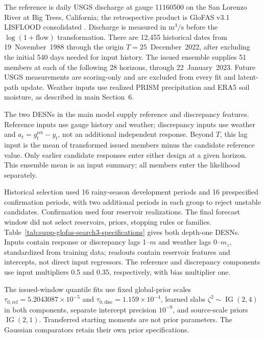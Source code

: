 \documentclass[12pt,letterpaper]{article}
\newcommand{\IG}{\operatorname{IG}}
\newcommand{\TableStyle}{\footnotesize\setlength{\tabcolsep}{4pt}\renewcommand{\arraystretch}{1.08}}
\numberwithin{suppalgorithm}{section}
\numberwithin{equation}{section}
\numberwithin{table}{section}
\numberwithin{figure}{section}
\begin{document}
The reference is daily USGS discharge at gauge 11160500 on the San
Lorenzo River at Big Trees, California; the retrospective product is
GloFAS v3.1 LISFLOOD consolidated
\citep{AlfieriEtAl2013GloFAS,HarriganEtAl2023GloFASForecasts}.
Discharge is measured in \(\mathrm m^3/\mathrm s\) before the
\(\log(1+\mathrm{flow})\) transformation. There are 12,455 historical
dates from 19~November~1988 through the origin \(T=25\)~December~2022,
after excluding the initial 540 days needed for input history. The issued
ensemble supplies 51 members at each of the following 28 horizons, through
22~January~2023. Future USGS measurements are scoring-only and are
excluded from every fit and latent-path update. Weather inputs use realized
PRISM precipitation and ERA5 soil moisture, as described in main Section~6.

The two DESNs in the main model supply reference and discrepancy features.
Reference inputs use gauge history and weather; discrepancy inputs use
weather and \(a_t=g_t^{\mathrm{ret}}-y_t\), not an additional independent
response. Beyond \(T\), this lag input is the mean of transformed
issued members minus the candidate reference value. Only earlier candidate
responses enter either design at a given horizon. This ensemble mean is
an input summary; all members enter the likelihood separately.

Historical selection used 16 rainy-season development periods and 16
prespecified confirmation periods, with two additional periods in each
group to reject unstable candidates. Confirmation used four reservoir
realizations. The final forecast window did not select reservoirs, priors,
stopping rules or families. Table~\ref{tab:supp-glofas-search3-specifications}
gives both depth-one DESNs. Inputs contain response or discrepancy lags
1--\(m\) and weather lags 0--\(m_z\), standardized from training data;
readouts contain reservoir features and intercepts, not direct input
regressors. The reference and discrepancy components use input multipliers
0.5 and 0.35, respectively, with bias multiplier one.

\begin{table}[!htbp]
\centering
\TableStyle
\caption{Selected depth-one GloFAS reservoirs. Maximum response and weather
lags are \(m\) and \(m_z\); selection excludes the final forecast window.}
\label{tab:supp-glofas-search3-specifications}

\end{table}

The issued-window quantile fits use fixed global-prior scales
\(\tau_{0,\mathrm{ref}}=5.2043087\times10^{-5}\) and
\(\tau_{0,\mathrm{disc}}=1.159\times10^{-4}\), learned slabs
\(\zeta^2\sim\IG(2,4)\) in both components, separate intercept
precision \(10^{-9}\), and source-scale priors \(\IG(2,1)\).
Transferred starting moments are not prior parameters. The Gaussian
comparators retain their own prior specifications.
\end{document}
